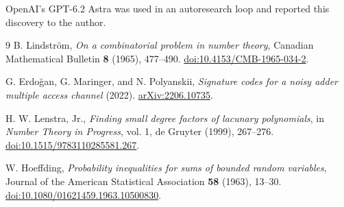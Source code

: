 \documentclass[11pt,letterpaper]{article}
\numberwithin{equation}{section}
\begin{document}
OpenAI's GPT-6.2 Astra was used in an autoresearch loop and reported this discovery to the author.

\begingroup\small
\begin{thebibliography}{9}
B. Lindstr\"om, \emph{On a combinatorial problem in number theory}, Canadian Mathematical
Bulletin \textbf{8} (1965), 477--490.
\href{https://doi.org/10.4153/CMB-1965-034-2}{doi:10.4153/CMB-1965-034-2}.

G. Erdo\u{g}an, G. Maringer, and N. Polyanskii, \emph{Signature codes for a noisy adder
multiple access channel} (2022). \href{https://arxiv.org/abs/2206.10735}{arXiv:2206.10735}.

H. W. Lenstra, Jr., \emph{Finding small degree factors of lacunary polynomials}, in
\emph{Number Theory in Progress}, vol. 1, de Gruyter (1999), 267--276.
\href{https://doi.org/10.1515/9783110285581.267}{doi:10.1515/9783110285581.267}.

W. Hoeffding, \emph{Probability inequalities for sums of bounded random variables}, Journal of
the American Statistical Association \textbf{58} (1963), 13--30.
\href{https://doi.org/10.1080/01621459.1963.10500830}{doi:10.1080/01621459.1963.10500830}.
\end{thebibliography}
\endgroup
\end{document}
